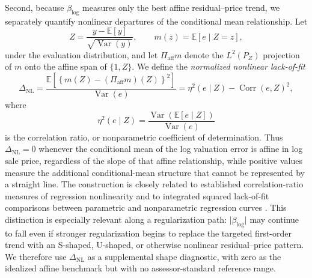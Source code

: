 \documentclass[10pt]{article}
\theoremstyle{definition}
\newcommand{\E}{\mathbb{E}}
\newcommand{\Corr}{\operatorname{Corr}}
\newcommand{\Var}{\operatorname{Var}}
\newcommand{\1}{\mathbf{1}}
\begin{document}

{\color{impGreen}
Second, because $\beta_{\log}$ measures only the best affine residual--price trend, we separately quantify nonlinear departures of the conditional mean relationship. Let
\[
Z=\frac{y-\E[y]}{\sqrt{\Var(y)}},
\qquad
m(z)=\E[e\mid Z=z],
\]
under the evaluation distribution, and let $\Pi_{\mathrm{aff}}m$ denote the
$L^2(P_Z)$ projection of $m$ onto the affine span of $\{1,Z\}$. We define the
\emph{normalized nonlinear lack-of-fit}
\begin{equation}
\label{eq:nonlinear_lack_of_fit}
\Delta_{\mathrm{NL}}
=
\frac{
\E\!\left[
\left\{
m(Z)-(\Pi_{\mathrm{aff}}m)(Z)
\right\}^{2}
\right]
}{
\Var(e)
}
=
\eta^2(e\mid Z)-\Corr(e,Z)^2,
\end{equation}
where
\[
\eta^2(e\mid Z)
=
\frac{\Var\!\left(\E[e\mid Z]\right)}{\Var(e)}
\]
is the correlation ratio, or nonparametric coefficient of determination. Thus
$\Delta_{\mathrm{NL}}=0$ whenever the conditional mean of the log valuation
error is affine in log sale price, regardless of the slope of that affine
relationship, while positive values measure the additional conditional-mean
structure that cannot be represented by a straight line. The construction is
closely related to established correlation-ratio measures of regression
nonlinearity and to integrated squared lack-of-fit comparisons between
parametric and nonparametric regression curves
\cite{DoksumSamarov1995,HardleMammen1993}. This distinction is especially
relevant along a regularization path: $\lvert\beta_{\log}\rvert$ may continue
to fall even if stronger regularization begins to replace the targeted
first-order trend with an S-shaped, U-shaped, or otherwise nonlinear
residual--price pattern. We therefore use $\Delta_{\mathrm{NL}}$ as a
supplemental shape diagnostic, with zero as the idealized affine benchmark but
with no assessor-standard reference range.
}

\end{document}
